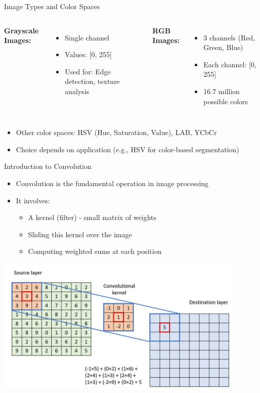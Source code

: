 \documentclass{beamer}
\begin{document}
\begin{frame}{Image Types and Color Spaces}
  \begin{columns}
      \textbf{Grayscale Images:}
      \begin{itemize}
        \item Single channel
        \item Values: [0, 255]
        \item Used for: Edge detection, texture analysis
      \end{itemize}
      \textbf{RGB Images:}
      \begin{itemize}
        \item 3 channels (Red, Green, Blue)
        \item Each channel: [0, 255]
        \item 16.7 million possible colors
      \end{itemize}
  \end{columns}
  \begin{itemize}
    \item Other color spaces: HSV (Hue, Saturation, Value), LAB, YCbCr
    \item Choice depends on application (e.g., HSV for color-based segmentation)
  \end{itemize}
\end{frame}

\begin{frame}{Introduction to Convolution}
  \begin{itemize}
    \item Convolution is the fundamental operation in image processing
    \item It involves:
      \begin{itemize}
        \item A kernel (filter) - small matrix of weights
        \item Sliding this kernel over the image
        \item Computing weighted sums at each position
      \end{itemize}
  \end{itemize}
  \begin{center}
    \includegraphics[width=0.9\textwidth]{images/conv_detail.png}
  \end{center}
\end{frame}
\end{document}

